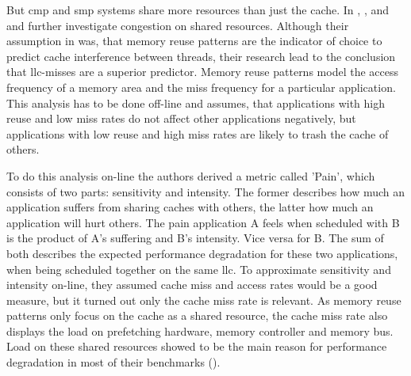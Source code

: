 But \gls{cmp} and \gls{smp} systems share more resources than just the cache.
In \cite{fedorova_managing_2010}, \cite{zhuravlev_addressing_2010}, and
\cite{zhuravlev_survey_2012} \citeauthor{fedorova_managing_2010} and
\citeauthor{zhuravlev_addressing_2010} further investigate congestion on shared
resources.
Although their assumption in \cite{fedorova_managing_2010} was, that memory
reuse patterns are the indicator of
choice to predict cache interference between threads, their research lead to
the conclusion that \gls{llc}-misses are a superior predictor.
Memory reuse patterns model the access frequency of a memory area and the miss
frequency for a particular application.
This analysis has to be done off-line and assumes, that applications with high
reuse and low miss rates do not affect other applications negatively, but
applications with low reuse and high miss rates are likely to trash the cache
of others.

To do this analysis on-line the authors derived a metric called 'Pain', which
consists of two parts: sensitivity and intensity.
The former describes how much an application suffers from sharing caches with
others, the latter how much an application will hurt others.
The pain application A feels when scheduled with B is the product of A's
suffering and B's intensity.
Vice versa for B.
The sum of both describes the expected performance degradation for these two
applications, when being scheduled together on the same \gls{llc}.
To approximate sensitivity and intensity on-line, they assumed cache miss and
access rates would be a good measure, but it turned out only the cache miss
rate is relevant.
As memory reuse patterns only focus on the cache as a shared resource, the
cache miss rate also displays the load on prefetching hardware, memory
controller and memory bus.
Load on these shared resources showed to be the main reason for performance
degradation in most of their benchmarks (\cite{zhuravlev_addressing_2010}).
\\

